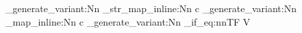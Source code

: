 %

%
%
%
%
%


\usepackage{expl3}
\usepackage{xparse}
\usepackage{forloop}
\usepackage{siunitx}


\ExplSyntaxOn
\cs_generate_variant:Nn \ior_str_map_inline:Nn { c } 
\cs_generate_variant:Nn \ior_map_inline:Nn { c }
\cs_generate_variant:Nn \tl_if_eq:nnTF { V }

\newcommand{\loadvariables}[2]{
	\krishna_csv_load:nn {#1} {#2}
}

